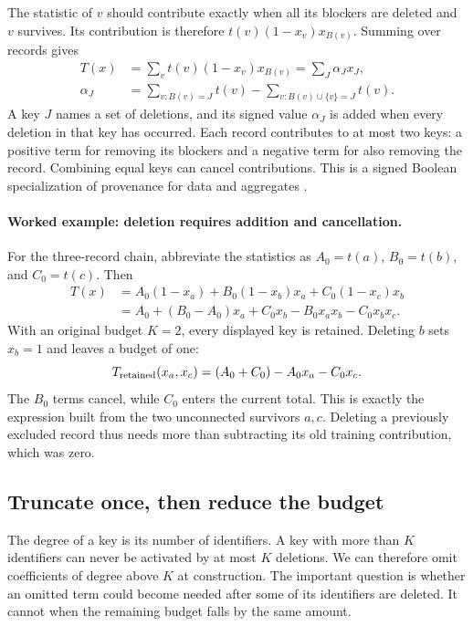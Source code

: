 The statistic of $v$ should contribute exactly when all its blockers are
deleted and $v$ survives. Its contribution is therefore
$t(v)(1-x_v)x_{B(v)}$. Summing over records gives
\begin{align}
 T(x)&=\sum_v t(v)(1-x_v)x_{B(v)}
       =\sum_J\alpha_J x_J,\label{eq:poly}\\
 \alpha_J&=\sum_{v:B(v)=J}t(v)
       -\sum_{v:B(v)\cup\{v\}=J}t(v).\label{eq:coeff}
\end{align}
A key $J$ names a set of deletions, and its signed value $\alpha_J$ is
added when every deletion in that key has occurred. Each record contributes
to at most two keys: a positive term for removing its blockers and a
negative term for also removing the record. Combining equal keys can
cancel contributions. This is a signed Boolean specialization of
provenance for data and aggregates \citep{green,aggregate}.

\paragraph{Worked example: deletion requires addition and cancellation.}
For the three-record chain, abbreviate the statistics as
$A_0=t(a)$, $B_0=t(b)$, and $C_0=t(c)$. Then
\begin{align*}
 T(x)&=A_0(1-x_a)+B_0(1-x_b)x_a+C_0(1-x_c)x_b\\
 &=A_0+(B_0-A_0)x_a+C_0x_b-B_0x_ax_b-C_0x_bx_c.
\end{align*}
With an original budget $K=2$, every displayed key is retained.
Deleting $b$ sets $x_b=1$ and leaves a budget of one:
\[
                  T_{\rm retained}(x_a,x_c)
                   =(A_0+C_0)-A_0x_a-C_0x_c.
\]
The $B_0$ terms cancel, while $C_0$ enters the current total. This is
exactly the expression built from the two unconnected survivors $a,c$.
Deleting a previously excluded record thus needs more than subtracting
its old training contribution, which was zero.

\subsection{Truncate once, then reduce the budget}
The degree of a key is its number of identifiers. A key with more than
$K$ identifiers can never be activated by at most $K$ deletions. We can
therefore omit coefficients of degree above $K$ at construction. The
important question is whether an omitted term could become needed after
some of its identifiers are deleted. It cannot when the remaining budget
falls by the same amount.

